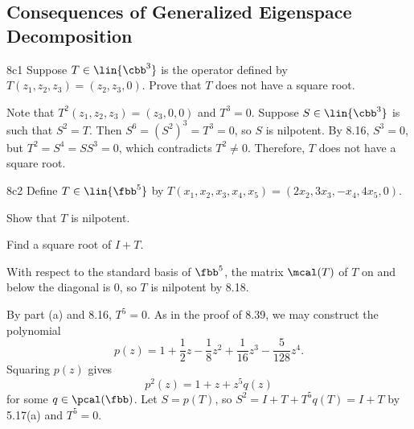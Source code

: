 \subsection{Consequences of Generalized Eigenspace Decomposition}


\begin{exercise}{8c1}
    Suppose $T \in \lin{\cbb^3}$ is the operator defined by $T(z_1, z_2, z_3) = (z_2, z_3, 0)$.
    Prove that $T$ does not have a square root.
\end{exercise}

\begin{sol}
    Note that $T^2(z_1, z_2, z_3) = (z_3, 0, 0)$ and $T^3 = 0$.
    Suppose $S \in \lin{\cbb^3}$ is such that $S^2 = T$.
    Then $S^6 = (S^2)^3 = T^3 = 0$, so $S$ is nilpotent.
    By 8.16, $S^3 = 0$, but $T^2 = S^4 = SS^3 = 0$, which contradicts $T^2 \neq 0$.
    Therefore, $T$ does not have a square root.
\end{sol}

\begin{exercise}{8c2}
    Define $T \in \lin{\fbb^5}$ by $T(x_1, x_2, x_3, x_4, x_5) = (2x_2, 3x_3, -x_4, 4x_5, 0)$.
    \begin{subexercises}
        \item Show that $T$ is nilpotent.
        \item Find a square root of $I + T$.
    \end{subexercises}
\end{exercise}

\begin{solenum}
    \item With respect to the standard basis of $\fbb^5$, the matrix $\mcal(T)$ of $T$ on and below the diagonal is $0$, so $T$ is nilpotent by 8.18.
    \item By part (a) and 8.16, $T^5 = 0$.
    As in the proof of 8.39, we may construct the polynomial
    \[
        p(z) = 1 + \frac{1}{2} z - \frac{1}{8} z^2 + \frac{1}{16} z^3 - \frac{5}{128} z^4.
    \]
    Squaring $p(z)$ gives
    \[
        p^2(z) = 1 + z + z^5 q(z)
    \]
    for some $q \in \pcal(\fbb)$.
    Let $S = p(T)$, so $S^2 = I + T + T^5 q(T) = I + T$ by 5.17(a) and $T^5 = 0$.
\end{solenum}

